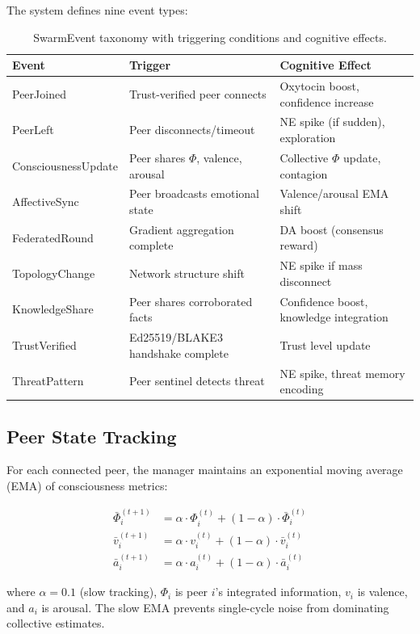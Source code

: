 \documentclass[11pt,a4paper]{article}
\begin{document}
The system defines nine event types:

\begin{table}[h]
\centering
\caption{SwarmEvent taxonomy with triggering conditions and cognitive effects.}
\label{tab:events}
\begin{tabular}{p{3.2cm}p{4cm}p{5cm}}
\toprule
\textbf{Event} & \textbf{Trigger} & \textbf{Cognitive Effect} \\
\midrule
PeerJoined & Trust-verified peer connects & Oxytocin boost, confidence increase \\
PeerLeft & Peer disconnects/timeout & NE spike (if sudden), exploration \\
ConsciousnessUpdate & Peer shares $\Phi$, valence, arousal & Collective $\Phi$ update, contagion \\
AffectiveSync & Peer broadcasts emotional state & Valence/arousal EMA shift \\
FederatedRound & Gradient aggregation complete & DA boost (consensus reward) \\
TopologyChange & Network structure shift & NE spike if mass disconnect \\
KnowledgeShare & Peer shares corroborated facts & Confidence boost, knowledge integration \\
TrustVerified & Ed25519/BLAKE3 handshake complete & Trust level update \\
ThreatPattern & Peer sentinel detects threat & NE spike, threat memory encoding \\
\bottomrule
\end{tabular}
\end{table}

\subsection{Peer State Tracking}

For each connected peer, the manager maintains an exponential moving average (EMA) of consciousness metrics:

\begin{align}
\bar{\Phi}_i^{(t+1)} &= \alpha \cdot \Phi_i^{(t)} + (1 - \alpha) \cdot \bar{\Phi}_i^{(t)} \\
\bar{v}_i^{(t+1)} &= \alpha \cdot v_i^{(t)} + (1 - \alpha) \cdot \bar{v}_i^{(t)} \\
\bar{a}_i^{(t+1)} &= \alpha \cdot a_i^{(t)} + (1 - \alpha) \cdot \bar{a}_i^{(t)}
\end{align}

\noindent where $\alpha = 0.1$ (slow tracking), $\Phi_i$ is peer $i$'s integrated information, $v_i$ is valence, and $a_i$ is arousal. The slow EMA prevents single-cycle noise from dominating collective estimates.
\end{document}

